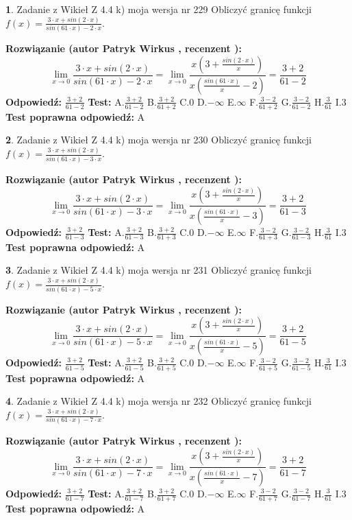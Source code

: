 \documentclass[12pt, a4paper]{article}
\theoremstyle{definition} %
\newtheorem{zad}{}
\newcommand{\zadStart}[1]{\begin{zad}#1\newline}
\newcommand{\zadStop}{\end{zad}}
\newcommand{\rozwStart}[2]{\noindent \textbf{Rozwiązanie (autor #1 , recenzent #2): }\newline}
\newcommand{\rozwStop}{\newline}
\newcommand{\odpStart}{\noindent \textbf{Odpowiedź:}\newline}
\newcommand{\odpStop}{\newline}
\newcommand{\testStart}{\noindent \textbf{Test:}\newline}
\newcommand{\testStop}{\newline}
\newcommand{\kluczStart}{\noindent \textbf{Test poprawna odpowiedź:}\newline}
\newcommand{\kluczStop}{\newline}
\begin{document}
\zadStart{Zadanie z Wikieł Z 4.4 k) moja wersja nr 229}
Obliczyć granicę funkcji $f(x)=\frac{3\cdot x +sin(2\cdot x)}{sin(61\cdot x) -2\cdot x}$.
\zadStop
\rozwStart{Patryk Wirkus}{}
$$\lim\limits_{x\to 0}\frac{3\cdot x +sin(2\cdot x)}{sin(61\cdot x) -2\cdot x}
=\lim\limits_{x\to 0}\frac{x(3+\frac{sin(2\cdot x)}{x})}{x(\frac{sin(61\cdot x)}{x}-2)}
=\frac{3+2}{61-2}$$
\rozwStop
\odpStart
$\frac{3+2}{61-2}$
\odpStop
\testStart
A.$\frac{3+2}{61-2}$
B.$\frac{3+2}{61+2}$
C.$0$
D.$-\infty$
E.$\infty$
F.$\frac{3-2}{61+2}$
G.$\frac{3-2}{61-2}$
H.$\frac{3}{61}$
I.$3$
\testStop
\kluczStart
A
\kluczStop



\zadStart{Zadanie z Wikieł Z 4.4 k) moja wersja nr 230}
Obliczyć granicę funkcji $f(x)=\frac{3\cdot x +sin(2\cdot x)}{sin(61\cdot x) -3\cdot x}$.
\zadStop
\rozwStart{Patryk Wirkus}{}
$$\lim\limits_{x\to 0}\frac{3\cdot x +sin(2\cdot x)}{sin(61\cdot x) -3\cdot x}
=\lim\limits_{x\to 0}\frac{x(3+\frac{sin(2\cdot x)}{x})}{x(\frac{sin(61\cdot x)}{x}-3)}
=\frac{3+2}{61-3}$$
\rozwStop
\odpStart
$\frac{3+2}{61-3}$
\odpStop
\testStart
A.$\frac{3+2}{61-3}$
B.$\frac{3+2}{61+3}$
C.$0$
D.$-\infty$
E.$\infty$
F.$\frac{3-2}{61+3}$
G.$\frac{3-2}{61-3}$
H.$\frac{3}{61}$
I.$3$
\testStop
\kluczStart
A
\kluczStop



\zadStart{Zadanie z Wikieł Z 4.4 k) moja wersja nr 231}
Obliczyć granicę funkcji $f(x)=\frac{3\cdot x +sin(2\cdot x)}{sin(61\cdot x) -5\cdot x}$.
\zadStop
\rozwStart{Patryk Wirkus}{}
$$\lim\limits_{x\to 0}\frac{3\cdot x +sin(2\cdot x)}{sin(61\cdot x) -5\cdot x}
=\lim\limits_{x\to 0}\frac{x(3+\frac{sin(2\cdot x)}{x})}{x(\frac{sin(61\cdot x)}{x}-5)}
=\frac{3+2}{61-5}$$
\rozwStop
\odpStart
$\frac{3+2}{61-5}$
\odpStop
\testStart
A.$\frac{3+2}{61-5}$
B.$\frac{3+2}{61+5}$
C.$0$
D.$-\infty$
E.$\infty$
F.$\frac{3-2}{61+5}$
G.$\frac{3-2}{61-5}$
H.$\frac{3}{61}$
I.$3$
\testStop
\kluczStart
A
\kluczStop



\zadStart{Zadanie z Wikieł Z 4.4 k) moja wersja nr 232}
Obliczyć granicę funkcji $f(x)=\frac{3\cdot x +sin(2\cdot x)}{sin(61\cdot x) -7\cdot x}$.
\zadStop
\rozwStart{Patryk Wirkus}{}
$$\lim\limits_{x\to 0}\frac{3\cdot x +sin(2\cdot x)}{sin(61\cdot x) -7\cdot x}
=\lim\limits_{x\to 0}\frac{x(3+\frac{sin(2\cdot x)}{x})}{x(\frac{sin(61\cdot x)}{x}-7)}
=\frac{3+2}{61-7}$$
\rozwStop
\odpStart
$\frac{3+2}{61-7}$
\odpStop
\testStart
A.$\frac{3+2}{61-7}$
B.$\frac{3+2}{61+7}$
C.$0$
D.$-\infty$
E.$\infty$
F.$\frac{3-2}{61+7}$
G.$\frac{3-2}{61-7}$
H.$\frac{3}{61}$
I.$3$
\testStop
\kluczStart
A
\kluczStop
\end{document}
